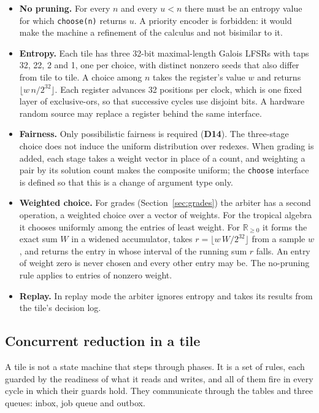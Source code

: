 \documentclass[11pt]{article}
\newcommand{\kw}[1]{\texttt{#1}}
\newcommand{\dec}[1]{\textbf{D#1}}
\theoremstyle{definition}
\theoremstyle{remark}
\begin{document}
\begin{itemize}
\item \textbf{No pruning.} For every $n$ and every $u<n$ there must be an
entropy value for which \kw{choose(n)} returns $u$. A priority encoder is
forbidden: it would make the machine a refinement of the calculus and not
bisimilar to it.
\item \textbf{Entropy.} Each tile has three 32-bit maximal-length Galois
LFSRs with taps 32, 22, 2 and 1, one per choice, with distinct nonzero seeds
that also differ from tile to tile. A choice among $n$ takes the register's
value $w$ and returns $\lfloor w\,n / 2^{32} \rfloor$. Each register advances
32 positions per clock, which is one fixed layer of exclusive-ors, so that
successive cycles use disjoint bits. A hardware random source may replace a
register behind the same interface.
\item \textbf{Fairness.} Only possibilistic fairness is required (\dec{14}).
The three-stage choice does not induce the uniform distribution over
redexes. When grading is added, each stage takes a weight vector in place of
a count, and weighting a pair by its solution count makes the composite
uniform; the \kw{choose} interface is defined so that this is a change of
argument type only.
\item \textbf{Weighted choice.} For grades (Section~\ref{sec:grades}) the
arbiter has a second operation, a weighted choice over a vector of weights.
For the tropical algebra it chooses uniformly among the entries of least
weight. For $\mathbb{R}_{\ge 0}$ it forms the exact sum $W$ in a widened
accumulator, takes $r = \lfloor w\,W / 2^{32} \rfloor$ from a sample $w$, and
returns the entry in whose interval of the running sum $r$ falls. An entry of
weight zero is never chosen and every other entry may be. The no-pruning rule
applies to entries of nonzero weight.
\item \textbf{Replay.} In replay mode the arbiter ignores entropy and takes
its results from the tile's decision log.
\end{itemize}

\subsection{Concurrent reduction in a tile}\label{sec:step}

A tile is not a state machine that steps through phases. It is a set of
rules, each guarded by the readiness of what it reads and writes, and all of
them fire in every cycle in which their guards hold. They communicate through
the tables and three queues: inbox, job queue and outbox.
\end{document}
